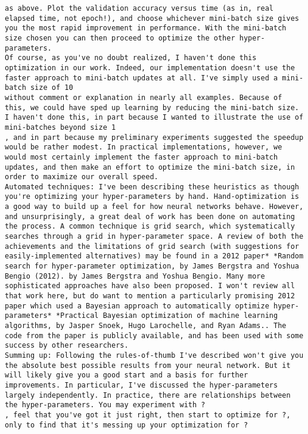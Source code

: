 \begin{lstlisting}
as above. Plot the validation accuracy versus time (as in, real elapsed time, not epoch!), and choose whichever mini-batch size gives you the most rapid improvement in performance. With the mini-batch size chosen you can then proceed to optimize the other hyper-parameters.
Of course, as you've no doubt realized, I haven't done this optimization in our work. Indeed, our implementation doesn't use the faster approach to mini-batch updates at all. I've simply used a mini-batch size of 10
without comment or explanation in nearly all examples. Because of this, we could have sped up learning by reducing the mini-batch size. I haven't done this, in part because I wanted to illustrate the use of mini-batches beyond size 1
, and in part because my preliminary experiments suggested the speedup would be rather modest. In practical implementations, however, we would most certainly implement the faster approach to mini-batch updates, and then make an effort to optimize the mini-batch size, in order to maximize our overall speed.
Automated techniques: I've been describing these heuristics as though you're optimizing your hyper-parameters by hand. Hand-optimization is a good way to build up a feel for how neural networks behave. However, and unsurprisingly, a great deal of work has been done on automating the process. A common technique is grid search, which systematically searches through a grid in hyper-parameter space. A review of both the achievements and the limitations of grid search (with suggestions for easily-implemented alternatives) may be found in a 2012 paper* *Random search for hyper-parameter optimization, by James Bergstra and Yoshua Bengio (2012). by James Bergstra and Yoshua Bengio. Many more sophisticated approaches have also been proposed. I won't review all that work here, but do want to mention a particularly promising 2012 paper which used a Bayesian approach to automatically optimize hyper-parameters* *Practical Bayesian optimization of machine learning algorithms, by Jasper Snoek, Hugo Larochelle, and Ryan Adams.. The code from the paper is publicly available, and has been used with some success by other researchers.
Summing up: Following the rules-of-thumb I've described won't give you the absolute best possible results from your neural network. But it will likely give you a good start and a basis for further improvements. In particular, I've discussed the hyper-parameters largely independently. In practice, there are relationships between the hyper-parameters. You may experiment with ?
, feel that you've got it just right, then start to optimize for ?, only to find that it's messing up your optimization for ?

\end{lstlisting}
